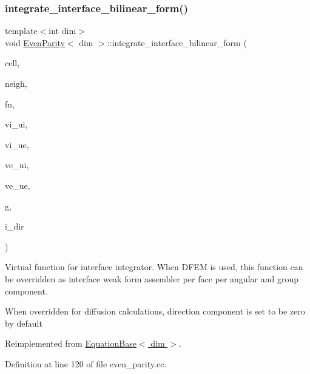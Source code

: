 \subsubsection{\texorpdfstring{integrate\+\_\+interface\+\_\+bilinear\+\_\+form()}{integrate\_interface\_bilinear\_form()}}
{\footnotesize\ttfamily template$<$int dim$>$ \\
void \hyperlink{class_even_parity}{Even\+Parity}$<$ dim $>$\+::integrate\+\_\+interface\+\_\+bilinear\+\_\+form (\begin{DoxyParamCaption}\item[{typename Do\+F\+Handler$<$ dim $>$\+::active\+\_\+cell\+\_\+iterator \&}]{cell,  }\item[{typename Do\+F\+Handler$<$ dim $>$\+::cell\+\_\+iterator \&}]{neigh,  }\item[{unsigned int \&}]{fn,  }\item[{Full\+Matrix$<$ double $>$ \&}]{vi\+\_\+ui,  }\item[{Full\+Matrix$<$ double $>$ \&}]{vi\+\_\+ue,  }\item[{Full\+Matrix$<$ double $>$ \&}]{ve\+\_\+ui,  }\item[{Full\+Matrix$<$ double $>$ \&}]{ve\+\_\+ue,  }\item[{const unsigned int \&}]{g,  }\item[{const unsigned int \&}]{i\+\_\+dir }\end{DoxyParamCaption})\hspace{0.3cm}{\ttfamily [virtual]}}



Virtual function for interface integrator. When D\+F\+EM is used, this function can be overridden as interface weak form assembler per face per angular and group component. 

When overridden for diffusion calculations, direction component is set to be zero by default 

Reimplemented from \hyperlink{class_equation_base_af56caa04c80d8f388e116307930d0063}{Equation\+Base$<$ dim $>$}.



Definition at line 120 of file even\+\_\+parity.\+cc.

\mbox{\label{class_even_parity_a595082361e618c077877f92d04ebab0b}} 
